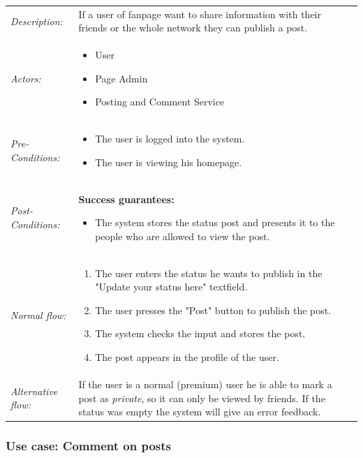 \documentclass[11pt,a4paper]{report}
\begin{document}
\begin{longtable}{p{} | p{}}
        \hline
        \emph{Description:} & If a user of fanpage want to share information with their friends or the whole network they can publish a post.\\
        \emph{Actors:} & 
            \begin{itemize} 
                \item User
                \item Page Admin
                \item Posting and Comment Service
             \end{itemize} \\
        \emph{Pre-Conditions:} & 
            \begin{itemize} 
                \item The user is logged into the system.
                \item The user is viewing his homepage.
             \end{itemize} \\
        \emph{Post-Conditions:} & \textbf{Success guarantees:} 
            \begin{itemize} 
                \item The system stores the status post and presents it to the people who are allowed to view the post.
             \end{itemize} \\
        \emph{Normal flow:} & 
            \begin{enumerate} 
                \item The user enters the status he wants to publish in the "Update your status here" textfield.
                \item The user presses the "Post" button to publish the post.
                \item The system checks the input and stores the post.
                \item The post appears in the profile of the user. 
             \end{enumerate} \\
        \emph{Alternative flow:} & If the user is a normal (premium) user he is able to mark a post as \emph{private}, so it can only be viewed by friends. If the status was empty the system will give an error feedback.\\ 
             \hline
\end{longtable}

\subsubsection{Use case: Comment on posts}
\end{document}
